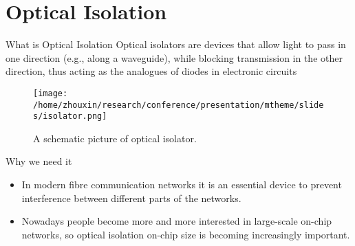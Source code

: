 \documentclass{beamer}
\begin{document}
\section{Optical Isolation}
\begin{frame}{What is Optical Isolation}
Optical isolators are devices that allow light to pass in one direction (e.g., along a waveguide), while blocking transmission in the other direction, thus acting as the analogues of diodes in electronic circuits
\begin{figure}

  \centering
    \texttt{[image: /home/zhouxin/research/conference/presentation/mtheme/slides/isolator.png]}
      \caption{A schematic picture of optical isolator.}
\end{figure}
     \vskip -0.5cm
    \begin{block}
    {Why we need it}
      \begin{itemize}
        \item In modern fibre communication networks it is an essential device to prevent interference between different parts of the networks.
        \item Nowadays people become more and more interested in large-scale on-chip networks, so optical isolation on-chip size is becoming increasingly important.
    \end{itemize}
  \end{block}
\end{frame}

 
\end{document}
